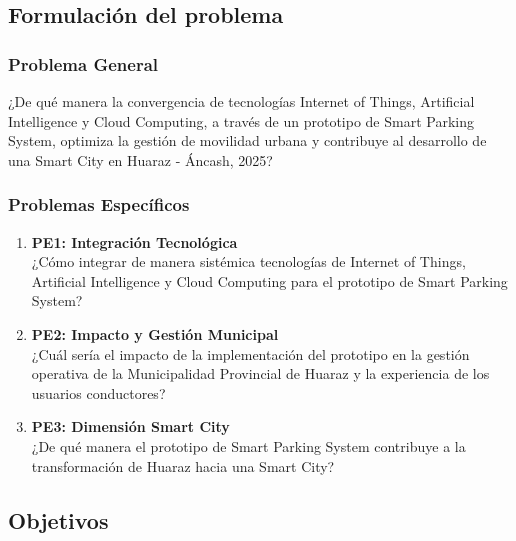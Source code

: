 \documentclass[12pt,a4paper]{article}
\begin{document}
\subsection{Formulación del problema}
\newcommand{\problemaGeneral}{¿De qué manera la convergencia de tecnologías Internet of Things, Artificial Intelligence y Cloud Computing, a través de un prototipo de Smart Parking System, optimiza la gestión de movilidad urbana y contribuye al desarrollo de una Smart City en Huaraz - Áncash, 2025?}

\newcommand{\problemaEspecificoUno}{¿Cómo integrar de manera sistémica tecnologías de Internet of Things, Artificial Intelligence y Cloud Computing para el prototipo de Smart Parking System?}

\newcommand{\problemaEspecificoDos}{¿Cuál sería el impacto de la implementación del prototipo en la gestión operativa de la Municipalidad Provincial de Huaraz y la experiencia de los usuarios conductores?}

\newcommand{\problemaEspecificoTres}{¿De qué manera el prototipo de Smart Parking System contribuye a la transformación de Huaraz hacia una Smart City?}
    
\subsubsection{Problema General}
\problemaGeneral{}

\subsubsection{Problemas Específicos}
\begin{enumerate}
	\item \textbf{PE1: Integración Tecnológica}\\
    \problemaEspecificoUno{}
    
    \item \textbf{PE2: Impacto y Gestión Municipal}\\
    \problemaEspecificoDos{}
    
    \item \textbf{PE3: Dimensión Smart City}\\
    \problemaEspecificoTres{}
\end{enumerate}

\subsection{Objetivos}
\newcommand{\objetivoGeneral}{Desarrollar un prototipo de Smart Parking System basado en la convergencia de tecnologías Internet of Things, Artificial Intelligence y Cloud Computing, que optimice la gestión de movilidad urbana y contribuya al desarrollo de una Smart City en Huaraz - Áncash, 2025.}
\end{document}
